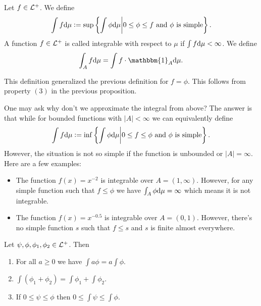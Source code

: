 \documentclass[11pt,a4paper]{article}
\begin{document}
\begin{definition}[Integrability]
  Let $f \in \mathcal{L}^+$.
  We define
  \[
    \int f \mathrm{d} \mu :=
    \sup\left\{\int \phi \mathrm{d} \mu \middle\vert 0 \le \phi \le f \text{ and } \phi 
    \text{ is simple}\right\}.
  \]
  A function $f \in \mathcal{L}^+$ is called integrable with respect to $\mu$ if
  $\int f \mathrm{d} \mu < \infty$.
  We define
  \[
    \int_{A} f \dmu = \int f \cdot \mathbbm{1}_{A} \dmu.
  \]
\end{definition}
\begin{remark}
  This definition generalized the previous definition for $f = \phi$.
  This follows from property $(3)$ in the previous proposition.
\end{remark}
\begin{remark}
  One may ask why don't we approximate the integral from above?
  The answer is that while for bounded functions with $|A| < \infty$
  we can equivalently define
  \[
    \int f \mathrm{d} \mu :=
    \inf\left\{\int \phi \mathrm{d} \mu \middle\vert 0 \le f \le \phi \text{ and } \phi
    \text{ is simple}\right\}.
  \]
  However, the situation is not so simple if the function is unbounded
  or $|A| = \infty$. Here are a few examples:
  \begin{itemize}
    \item The function $f(x) = x^{-2}$ is integrable over $A = (1,\infty)$.
      However, for any simple function such that $f \le \phi$ we have
      $\int_{A} \phi \mathrm{d} \mu = \infty$ which means it is not integrable.
    \item The function $f(x) = x^{-0.5}$ is integrable over $A = (0,1)$.
      However, there's no simple function $s$ such that $f \le s$ and
      $s$ is finite almost everywhere.
  \end{itemize}
\end{remark}

\begin{proposition}
  \label{prp:l-plus-properties}
  Let $\psi, \phi, \phi_1, \phi_2 \in \mathcal{L}^+$.
  Then
  \begin{enumerate}
    \item[(1)] For all $a \geq 0$ we have $\int a \phi = a \int \phi$.
    \item[(2)] $\int (\phi_1 + \phi_2) = \int \phi_1 + \int \phi_2$.
    \item[(3)] If $0 \le \psi \le \phi$ then $0 \le \int \psi \le \int \phi$.
  \end{enumerate}
\end{proposition}
\end{document}
